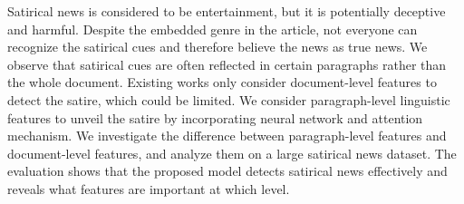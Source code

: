 Satirical news is considered to be entertainment, but it is potentially deceptive and harmful. Despite the embedded genre in the article, not everyone can recognize the satirical cues and therefore believe the news as true news. We observe that satirical cues are often reflected in certain paragraphs rather than the whole document. Existing works only consider document-level features to detect the satire, which could be limited. We consider paragraph-level linguistic features to unveil the satire by incorporating neural network and attention mechanism. We investigate the difference between paragraph-level features and document-level features, and analyze them on a large satirical news dataset. The evaluation shows that the proposed model detects satirical news effectively and reveals what features are important at which level.
